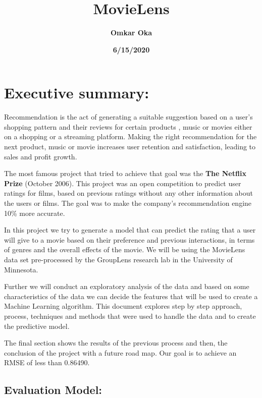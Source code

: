 \documentclass[
]{article}
\title{\textbf{MovieLens}}
\author{\textbf{Omkar Oka}}
\date{\textbf{6/15/2020}}
\begin{document}
\maketitle

{
\setcounter{tocdepth}{2}
\tableofcontents
}
\newpage

\hypertarget{executive-summary}{%
\section{\texorpdfstring{\textbf{Executive
summary:}}{Executive summary:}}\label{executive-summary}}

Recommendation is the act of generating a suitable suggestion based on a
user's shopping pattern and their reviews for certain products , music
or movies either on a shopping or a streaming platform. Making the right
recommendation for the next product, music or movie increases user
retention and satisfaction, leading to sales and profit growth.

The most famous project that tried to achieve that goal was the
\textbf{The Netflix Prize} (October 2006). This project was an open
competition to predict user ratings for films, based on previous ratings
without any other information about the users or films. The goal was to
make the company's recommendation engine 10\% more accurate.

In this project we try to generate a model that can predict the rating
that a user will give to a movie based on their preference and previous
interactions, in terms of genres and the overall effects of the movie.
We will be using the MovieLens data set pre-processed by the GroupLens
research lab in the University of Minnesota.

Further we will conduct an exploratory analysis of the data and based on
some characteristics of the data we can decide the features that will be
used to create a Machine Learning algorithm. This document explores step
by step approach, process, techniques and methods that were used to
handle the data and to create the predictive model.

The final section shows the results of the previous process and then,
the conclusion of the project with a future road map. Our goal is to
achieve an RMSE of less than 0.86490.

\hypertarget{evaluation-model}{%
\subsection{\texorpdfstring{\textbf{Evaluation
Model:}}{Evaluation Model:}}\label{evaluation-model}}
\end{document}
